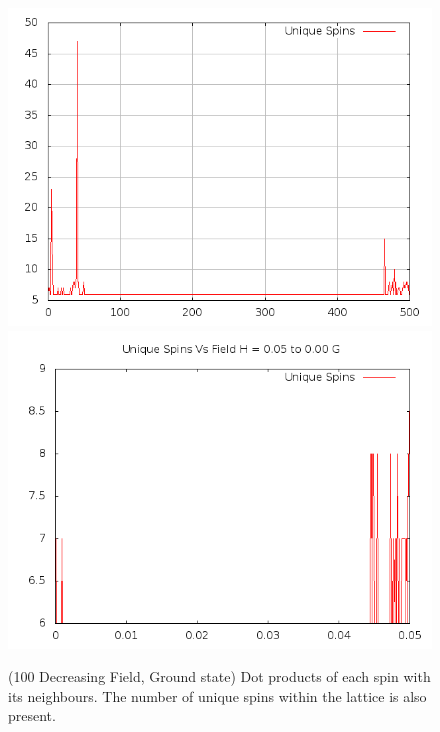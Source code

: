 \documentclass{article}
\begin{document}
\begin{figure}[ht]
\centering
\includegraphics[scale=0.5]{100/000to005Freq.png}
\includegraphics[scale=0.5]{100/005to000Freq.png}
\caption{(100 Decreasing Field, Ground state) Dot products of each spin with its neighbours. The number of unique spins within the lattice is also present.}
\end{figure}
\clearpage
\end{document}
